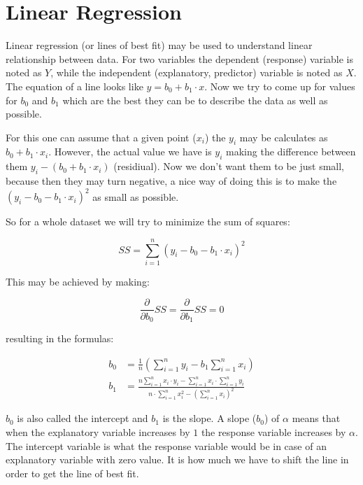 \chapter*{Linear Regression}

\setcounter{section}{0}
\renewcommand*{\theHsection}{ch7.\the\value{section}}

Linear regression (or lines of best fit) may be used to understand linear
relationship between data. For two variables the dependent (response) variable
is noted as $Y$, while the independent (explanatory, predictor) variable is
noted as $X$. The equation of a line looks like $y=b_0+b_1 \cdot x$. Now we try to
come up for values for $b_0$ and $b_1$ which are the best they can be to
describe the data as well as possible.

For this one can assume that a given point ($x_i$) the $y_i$ may be calculates
as $b_0+b_1 \cdot x_i$. However, the actual value we have is $y_i$ making the
difference between them $y_i-(b_0+b_1 \cdot x_i)$ (residiual). Now we
don't want them to be just small, because then they may turn negative, a nice way of
doing this is to make the $(y_i-b_0-b_1 \cdot x_i)^2$ as small as possible.


So for a whole dataset we will try to minimize the sum of squares:

\[ SS = \sum_{i=1}^n (y_i-b_0-b_1 \cdot x_i)^2 \]

This may be achieved by making:

\[ \frac{\partial}{\partial b_0}SS = \frac{\partial}{\partial b_1} SS = 0 \]

resulting in the formulas:

\begin{align*}
	b_0 & = \frac{1}{n} \left( \sum_{i=1}^{n} y _i - b_1 \sum_{i=1}^{n} x_i \right)
	\\
	b_1 & = \frac{n \sum_{i=1}^{n} x_i \cdot y_i - \sum_{i=1}^{n} x_i
		\cdot \sum_{i=1}^{n} y_i}{n \cdot \sum_{i=1}^{n} x_i^2 - \left(\sum_{i=1}^{n}
		x_i \right)^2}
\end{align*}

$b_0$ is also called the intercept and $b_1$ is the slope. A slope ($b_0$) of
$\alpha$ means that when the explanatory variable increases by $1$ the response
variable increases by $\alpha$. The intercept variable is what the response
variable would be in case of an explanatory variable with zero value. It is how
much we have to shift the line in order to get the line of best fit.

